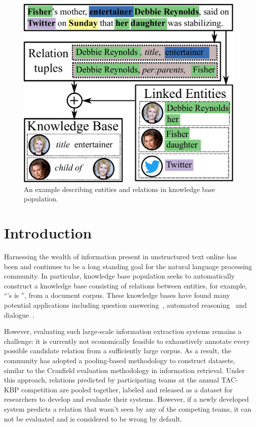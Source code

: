 \begin{figure}[t]
  \centering
  \includegraphics[width=0.9\columnwidth]{figures/entities-example.pdf}
  \caption{\label{fig:example} An example describing entities and relations in knowledge base population.}
\end{figure}

\section{Introduction}
\label{sec:intro}

Harnessing the wealth of information present in unstructured text online has been and continues to be a long standing goal for the natural language processing community.
In particular, knowledge base population seeks to automatically construct a knowledge base consisting of relations between entities, for example, ``'s  is '', from a document corpus. 
These knowledge bases have found many potential applications including question answering~\citep{berant2013freebase, fader2014open,reddy2014large}, automated reasoning~\citep{kalyanpur2012structured} and dialogue~\citep{lee2015conversational,han2015exploiting}.

However, evaluating such large-scale information extraction systems remains a challenge:
it is currently not economically feasible to exhaustively annotate every possible candidate relation from a sufficiently large corpus.
As a result, the community has adopted a pooling-based methodology to construct datasets, similar to the Cranfield evaluation methodology in information retrieval.
Under this approach, relations predicted by participating teams at the annual TAC-KBP competition are pooled together, labeled and released as a dataset for researchers to develop and evaluate their systems.
However, if a newly developed system predicts a relation that wasn't seen by any of the competing teams, it can not be evaluated and is considered to be wrong by default. 

